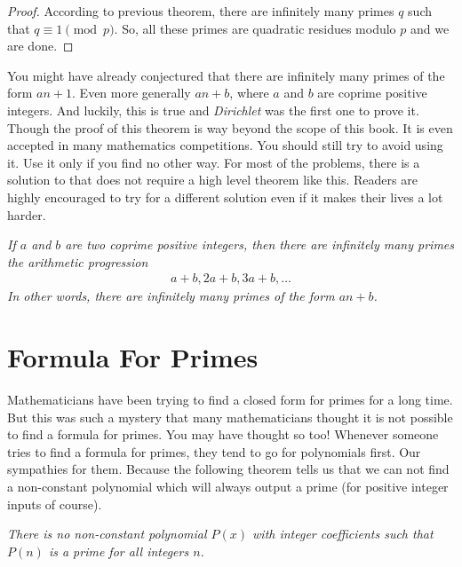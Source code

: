 \documentclass{subfiles}
\begin{document}
	\begin{proof}
		According to previous theorem, there are infinitely many primes $q$ such that $q \equiv 1 \pmod p$. So, all these primes are quadratic residues modulo $p$ and we are done.
	\end{proof}
	You might have already conjectured that there are infinitely many primes of the form $an+1$. Even more generally $an+b$, where $a$ and $b$ are coprime positive integers. And luckily, this is true and \textit{Dirichlet} was the first one to prove it. Though the proof of this theorem is way beyond the scope of this book. It is even accepted in many mathematics competitions. You should still try to avoid using it. Use it only if you find no other way. For most of the problems, there is a solution to that does not require a high level theorem like this. Readers are highly encouraged to try for a different solution even if it makes their  lives a lot harder.
	\begin{theorem}\slshape
		If $a$ and $b$ are two coprime positive integers, then there are infinitely many primes the arithmetic progression
		\begin{align*}
			a+b, 2a+b, 3a+b, \dots
		\end{align*}
		In other words, there are infinitely many primes of the form $an+b$.
	\end{theorem}
	\section{Formula For Primes}
	Mathematicians have been trying to find a closed form for primes for a long time. But this was such a mystery that many mathematicians thought it is not possible to find a formula for primes. You may have thought so too! Whenever someone tries to find a formula for primes, they tend to go for polynomials first. Our sympathies for them. Because the following theorem tells us that we can not find a non-constant polynomial which will always output a prime (for positive integer inputs of course).
	\begin{theorem}\slshape
		There is no non-constant polynomial $P(x)$ with integer coefficients such that $P(n)$ is a prime for all integers $n$.
	\end{theorem}
	
\end{document}
